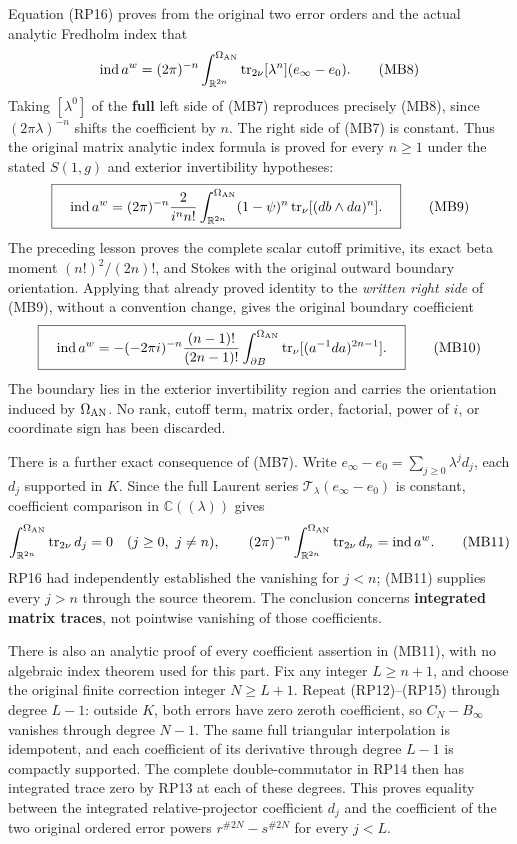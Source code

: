 \documentclass[
  11pt,
]{article}
\begin{document}
Equation (RP16) proves from the original two error orders and the actual
analytic Fredholm index that \[
 \operatorname{ind}a^w
  =(2\pi)^{-n}\int_{\mathbb R^{2n}}^{\Omega_{\rm AN}}
       \operatorname{tr}_{2\nu}[\lambda^n]
           (e_\infty-e_0).
 \tag{MB8}
\] Taking \([\lambda^0]\) of the \textbf{full} left side of (MB7)
reproduces precisely (MB8), since \((2\pi\lambda)^{-n}\) shifts the
coefficient by \(n\). The right side of (MB7) is constant. Thus the
original matrix analytic index formula is proved for every \(n\ge1\)
under the stated \(S(1,g)\) and exterior invertibility hypotheses: \[
 \boxed{\quad
 \operatorname{ind}a^w
 =(2\pi)^{-n}\frac{2}{i^n n!}
      \int_{\mathbb R^{2n}}^{\Omega_{\rm AN}}
       (1-\psi)^n
       \operatorname{tr}_{\nu}[(db\wedge da)^n].
 \quad}
 \tag{MB9}
\] The preceding lesson proves the complete scalar cutoff primitive, its
exact beta moment \((n!)^2/(2n)!\), and Stokes with the original outward
boundary orientation. Applying that already proved identity to the
\emph{written right side} of (MB9), without a convention change, gives
the original boundary coefficient \[
 \boxed{\quad
 \operatorname{ind}a^w
 =-(-2\pi i)^{-n}\frac{(n-1)!}{(2n-1)!}
       \int_{\partial B}^{\Omega_{\rm AN}}
          \operatorname{tr}_{\nu}[(a^{-1}da)^{2n-1}].
 \quad}
 \tag{MB10}
\] The boundary lies in the exterior invertibility region and carries
the orientation induced by \(\Omega_{\rm AN}\). No rank, cutoff term,
matrix order, factorial, power of \(i\), or coordinate sign has been
discarded.

There is a further exact consequence of (MB7). Write
\(e_\infty-e_0=\sum_{j\ge0}\lambda^j d_j\), each \(d_j\) supported in
\(K\). Since the full Laurent series
\(\mathcal T_\lambda(e_\infty-e_0)\) is constant, coefficient comparison
in \(\mathbb C((\lambda))\) gives \[
 \int_{\mathbb R^{2n}}^{\Omega_{\rm AN}}
     \operatorname{tr}_{2\nu}d_j=0\quad(j\ge0,\ j\ne n),
 \qquad
 (2\pi)^{-n}\int_{\mathbb R^{2n}}^{\Omega_{\rm AN}}
     \operatorname{tr}_{2\nu}d_n=\operatorname{ind}a^w .
 \tag{MB11}
\] RP16 had independently established the vanishing for \(j<n\); (MB11)
supplies every \(j>n\) through the source theorem. The conclusion
concerns \textbf{integrated matrix traces}, not pointwise vanishing of
those coefficients.

There is also an analytic proof of every coefficient assertion in
(MB11), with no algebraic index theorem used for this part. Fix any
integer \(L\geq n+1\), and choose the original finite correction integer
\(N\geq L+1\). Repeat (RP12)--(RP15) through degree \(L-1\): outside
\(K\), both errors have zero zeroth coefficient, so \(C_N-B_\infty\)
vanishes through degree \(N-1\). The same full triangular interpolation
is idempotent, and each coefficient of its derivative through degree
\(L-1\) is compactly supported. The complete double-commutator in RP14
then has integrated trace zero by RP13 at each of these degrees. This
proves equality between the integrated relative-projector coefficient
\(d_j\) and the coefficient of the two original ordered error powers
\(r^{\#2N}-s^{\#2N}\) for every \(j<L\).
\end{document}
